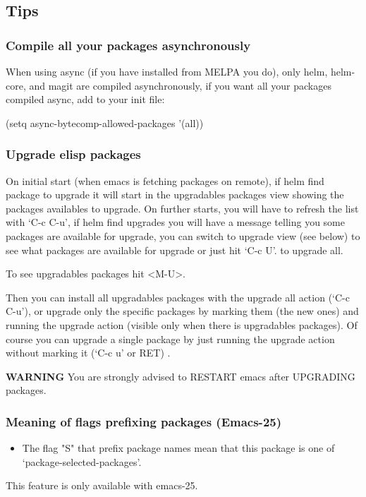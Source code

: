 \documentclass[11pt]{article}
\begin{document}
\subsection{Tips}
\label{sec:org3091621}

\subsubsection{Compile all your packages asynchronously}
\label{sec:org5fa79ce}

When using async (if you have installed from MELPA you do), only helm, helm-core,
and magit are compiled asynchronously, if you want all your packages compiled async,
add to your init file:

(setq async-bytecomp-allowed-packages ’(all))

\subsubsection{Upgrade elisp packages}
\label{sec:org27c80c5}

On initial start (when emacs is fetching packages on remote), if helm find
package to upgrade it will start in the upgradables packages view showing the packages
availables to upgrade.
On further starts, you will have to refresh the list with ‘C-c C-u’, if helm find upgrades
you will have a message telling you some packages are available for upgrade, you can switch to
upgrade view (see below) to see what packages are available for upgrade or just hit ‘C-c U’.
to upgrade all.

To see upgradables packages hit <M-U>.

Then you can install all upgradables packages with the upgrade all action (‘C-c C-u’),
or upgrade only the specific packages by marking them (the new ones) and running
the upgrade action (visible only when there is upgradables packages).
Of course you can upgrade a single package by just running the upgrade action
without marking it (‘C-c u’ or RET) .

\textbf{WARNING} You are strongly advised to RESTART emacs after UPGRADING packages.

\subsubsection{Meaning of flags prefixing packages (Emacs-25)}
\label{sec:orgc9e3081}

\begin{itemize}
\item The flag "S" that prefix package names mean that this package is one of ‘package-selected-packages’.
\end{itemize}
This feature is only available with emacs-25.
\end{document}
